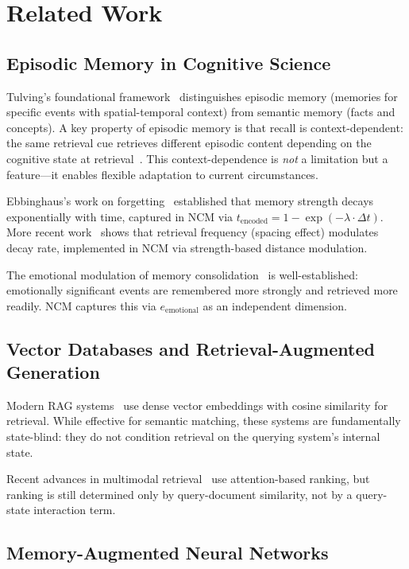 \documentclass[10pt,twocolumn,letterpaper]{article}
\begin{document}
\section{Related Work}
\label{sec:related}

\subsection{Episodic Memory in Cognitive Science}

Tulving's foundational framework~\cite{Tulving1972, Tulving1983} distinguishes episodic memory (memories for specific events with spatial-temporal context) from semantic memory (facts and concepts). A key property of episodic memory is that recall is context-dependent: the same retrieval cue retrieves different episodic content depending on the cognitive state at retrieval~\cite{Dubrow2016}. This context-dependence is \textit{not} a limitation but a feature---it enables flexible adaptation to current circumstances.

Ebbinghaus's work on forgetting~\cite{Ebbinghaus1885} established that memory strength decays exponentially with time, captured in NCM via $t_{\text{encoded}} = 1 - \exp(-\lambda \cdot \Delta t)$. More recent work~\cite{Cepeda2006} shows that retrieval frequency (spacing effect) modulates decay rate, implemented in NCM via strength-based distance modulation.

The emotional modulation of memory consolidation~\cite{McGaugh2000} is well-established: emotionally significant events are remembered more strongly and retrieved more readily. NCM captures this via $e_{\text{emotional}}$ as an independent dimension.

\subsection{Vector Databases and Retrieval-Augmented Generation}

Modern RAG systems~\cite{Lewis2020, Karpukhin2020} use dense vector embeddings with cosine similarity for retrieval. While effective for semantic matching, these systems are fundamentally state-blind: they do not condition retrieval on the querying system's internal state.

Recent advances in multimodal retrieval~\cite{Vaswani2017} use attention-based ranking, but ranking is still determined only by query-document similarity, not by a query-state interaction term.

\subsection{Memory-Augmented Neural Networks}
\end{document}
